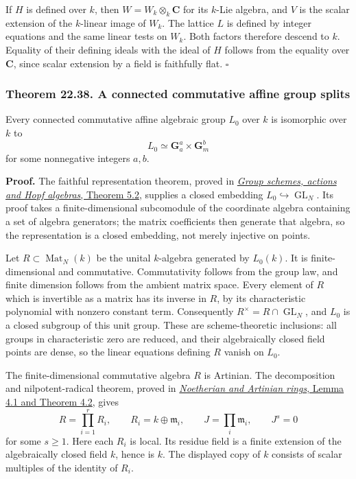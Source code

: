 \documentclass[
  11pt,
  a4paper,
]{article}
\begin{document}
If \(H\) is defined over \(k\), then \(W=W_k\otimes_k\mathbf C\) for its
\(k\)-Lie algebra, and \(V\) is the scalar extension of the \(k\)-linear
image of \(W_k\). The lattice \(L\) is defined by integer equations and
the same linear tests on \(W_k\). Both factors therefore descend to
\(k\). Equality of their defining ideals with the ideal of \(H\) follows
from the equality over \(\mathbf C\), since scalar extension by a field
is faithfully flat. \(\square\)

\subsubsection{Theorem 22.38. A connected commutative affine group
splits}\label{theorem-22.38.-a-connected-commutative-affine-group-splits}

Every connected commutative affine algebraic group \(L_0\) over \(k\) is
isomorphic over \(k\) to \[
 L_0\simeq\mathbf G_a^a\times\mathbf G_m^b
 \tag{22.96}
\] for some nonnegative integers \(a,b\).

\textbf{Proof.} The faithful representation theorem, proved in
\href{https://kokunoyumeto.github.io/open-math-courses-public/courses/AG-GS/AG-GS-01.html\#5-why-affine-groups-over-a-field-are-matrix-groups}{\emph{Group
schemes, actions and Hopf algebras}, Theorem 5.2}, supplies a closed
embedding \(L_0\hookrightarrow\operatorname{GL}_N\). Its proof takes a
finite-dimensional subcomodule of the coordinate algebra containing a
set of algebra generators; the matrix coefficients then generate that
algebra, so the representation is a closed embedding, not merely
injective on points.

Let \(R\subset\operatorname{Mat}_N(k)\) be the unital \(k\)-algebra
generated by \(L_0(k)\). It is finite-dimensional and commutative.
Commutativity follows from the group law, and finite dimension follows
from the ambient matrix space. Every element of \(R\) which is
invertible as a matrix has its inverse in \(R\), by its characteristic
polynomial with nonzero constant term. Consequently
\(R^\times=R\cap\operatorname{GL}_N\), and \(L_0\) is a closed subgroup
of this unit group. These are scheme-theoretic inclusions: all groups in
characteristic zero are reduced, and their algebraically closed field
points are dense, so the linear equations defining \(R\) vanish on
\(L_0\).

The finite-dimensional commutative algebra \(R\) is Artinian. The
decomposition and nilpotent-radical theorem, proved in
\href{https://kokunoyumeto.github.io/open-math-courses-public/courses/AG-CA/AG-CA-03.html\#4-what-an-artinian-ring-looks-like}{\emph{Noetherian
and Artinian rings}, Lemma 4.1 and Theorem 4.2}, gives \[
 R=\prod_{i=1}^r R_i,\qquad R_i=k\oplus\mathfrak m_i,
 \qquad J=\prod_i\mathfrak m_i,\qquad J^s=0
 \tag{22.97}
\] for some \(s\ge1\). Here each \(R_i\) is local. Its residue field is
a finite extension of the algebraically closed field \(k\), hence is
\(k\). The displayed copy of \(k\) consists of scalar multiples of the
identity of \(R_i\).
\end{document}
